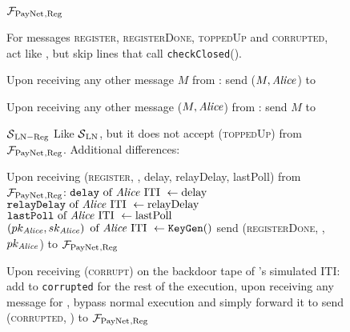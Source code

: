 \begin{figure}[H]
  \begin{systembox}{$\mathcal{F}_{\mathrm{PayNet}}{}_{\mathrm{, Reg}}$}
    \begin{algorithmic}[1]
      \State For messages \textsc{register}, \textsc{registerDone},
      \textsc{toppedUp} and \textsc{corrupted}, act like \fpaynet{}, but skip
      lines that call \texttt{checkClosed}().
      \Statex

      \State Upon receiving any other message $M$ from \alice:
      \Indent
          \State send ($M, \mathit{Alice}$) to \simulator
        \EndIf
      \EndIndent
      \Statex

      \State Upon receiving any other message ($M, \mathit{Alice}$) from \simulator:
      \Indent
          \State send $M$ to \alice
        \EndIf
      \EndIndent
    \end{algorithmic}
  \end{systembox}
  \caption{}
  \label{alg:proof:fpaynet:reg}
\end{figure}

\begin{figure}[H]
  \begin{simulatorbox}{$\mathcal{S}{}_{\mathrm{LN - Reg}}$}
    Like $\mathcal{S}{}_{\mathrm{LN}}$, but it does not accept
    (\textsc{toppedUp}) from $\mathcal{F}_{\mathrm{PayNet}}{}_{\mathrm{, Reg}}$.
    Additional differences:
    \begin{algorithmic}[1]
      \State Upon receiving (\textsc{register}, \alice, delay, relayDelay,
      lastPoll) from $\mathcal{F}_{\mathrm{PayNet}}{}_{\mathrm{, Reg}}$:
      \Indent
        \State $\mathtt{delay} \text{ of \ensuremath{\mathit{Alice}}{} ITI } \gets \mathrm{delay}$
        \label{alg:sim:reg:delay}
        \State $\mathtt{relayDelay} \text{ of \ensuremath{\mathit{Alice}}{} ITI } \gets
        \mathrm{relayDelay}$
        \State $\mathtt{lastPoll} \text{ of \ensuremath{\mathit{Alice}}{} ITI } \gets
        \mathrm{lastPoll}$
        \State $\left(pk_{\mathit{Alice}}, sk_{\mathit{Alice}}\right) \text{ of \ensuremath{\mathit{Alice}}{} ITI }
        \gets \mathtt{KeyGen}()$
        \label{alg:sim:reg:keygen}
        \State send (\textsc{registerDone}, \alice, $pk_{\mathit{Alice}}$) to
        $\mathcal{F}_{\mathrm{PayNet}}{}_{\mathrm{, Reg}}$
      \EndIndent
      \Statex

      \State Upon receiving (\textsc{corrupt}) on the backdoor tape of \alice's
      simulated ITI:
      \Indent
        \State add \alice{} to \texttt{corrupted}
        \State for the rest of the execution, upon receiving any message for
        \alice{}, bypass normal execution and simply forward it to
        \alice
        \State send (\textsc{corrupted}, \alice) to $\mathcal{F}_{\mathrm{PayNet}}{}_{\mathrm{,
        Reg}}$
      \EndIndent
    \end{algorithmic}
  \end{simulatorbox}
  \caption{}
  \label{alg:sim:reg}
\end{figure}

